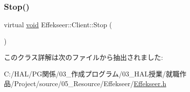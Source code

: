 \subsubsection{\texorpdfstring{Stop()}{Stop()}}
{\footnotesize\ttfamily virtual \mbox{\hyperlink{namespace_effekseer_ab34c4088e512200cf4c2716f168deb56}{void}} Effekseer\+::\+Client\+::\+Stop (\begin{DoxyParamCaption}{ }\end{DoxyParamCaption})\hspace{0.3cm}{\ttfamily [pure virtual]}}



このクラス詳解は次のファイルから抽出されました\+:\begin{DoxyCompactItemize}
\item 
C\+:/\+H\+A\+L/\+P\+G関係/03\+\_\+作成プログラム/03\+\_\+\+H\+A\+L授業/就職作品/\+Project/source/05\+\_\+\+Resource/\+Effekseer/\mbox{\hyperlink{_effekseer_8h}{Effekseer.\+h}}\end{DoxyCompactItemize}
